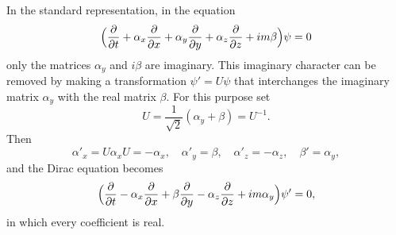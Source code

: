 \begin{enumerate}
\SolutionHeading In the standard representation, in the equation
\[
\Bigl(\frac{\partial}{\partial t} + \alpha_x\frac{\partial}{\partial x} + \alpha_y\frac{\partial}{\partial y} + \alpha_z\frac{\partial}{\partial z} + im\beta\Bigr)\psi = 0
\]
only the matrices $\alpha_y$ and $i\beta$ are imaginary. This imaginary character can be removed by making a transformation $\psi' = U\psi$ that interchanges the imaginary matrix $\alpha_y$ with the real matrix $\beta$. For this purpose set
\[
U = \frac{1}{\sqrt2}(\alpha_y + \beta) = U^{-1}.
\]
Then
\[
\alpha'_x = U\alpha_x U = -\alpha_x,\quad \alpha'_y = \beta,\quad \alpha'_z = -\alpha_z,\quad \beta' = \alpha_y,
\]
and the Dirac equation becomes
\[
\Bigl(\frac{\partial}{\partial t} - \alpha_x\frac{\partial}{\partial x} + \beta\frac{\partial}{\partial y} - \alpha_z\frac{\partial}{\partial z} + im\alpha_y\Bigr)\psi' = 0,
\]
in which every coefficient is real.
\end{enumerate}
